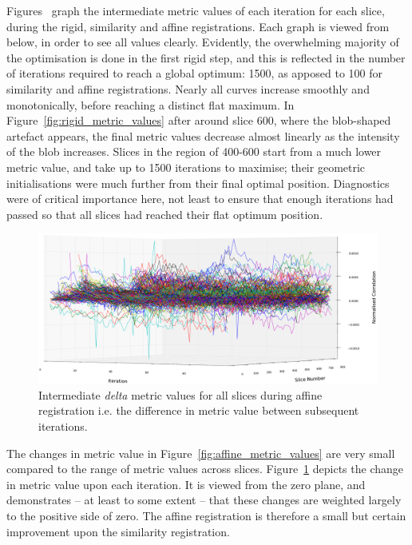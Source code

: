	Figures~ graph the intermediate metric values of each iteration for each slice, during the rigid, similarity and affine registrations. Each graph is viewed from below, in order to see all values clearly. Evidently, the overwhelming majority of the optimisation is done in the first rigid step, and this is reflected in the number of iterations required to reach a global optimum: 1500, as apposed to 100 for similarity and affine registrations. Nearly all curves increase smoothly and monotonically, before reaching a distinct flat maximum. In Figure~\ref{fig:rigid_metric_values} after around slice 600, where the blob-shaped artefact appears, the final metric values decrease almost linearly as the intensity of the blob increases. Slices in the region of 400-600 start from a much lower metric value, and take up to 1500 iterations to maximise; their geometric initialisations were much further from their final optimal position. Diagnostics were of critical importance here, not least to ensure that enough iterations had passed so that all slices had reached their flat optimum position.
	
  \begin{figure}
    \centering
    \includegraphics[width=\textheight]{Ch5/Figs/diagnostics/affine_metric_value_differences}
    \caption{Intermediate \emph{delta} metric values for all slices during affine registration i.e. the difference in metric value between subsequent iterations.}
    \label{fig:affine_metric_value_differences}
  \end{figure}
  
	The changes in metric value in Figure~\ref{fig:affine_metric_values} are very small compared to the range of metric values across slices. Figure~\ref{fig:affine_metric_value_differences} depicts the change in metric value upon each iteration. It is viewed from the zero plane, and demonstrates -- at least to some extent -- that these changes are weighted largely to the positive side of zero. The affine registration is therefore a small but certain improvement upon the similarity registration.
	
